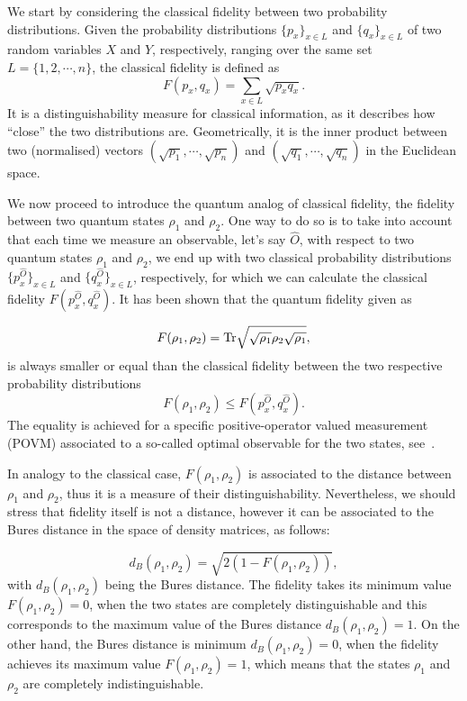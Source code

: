 We start by considering the classical fidelity between two probability distributions. Given the probability distributions $\{p_x\}_{x\in L}$ and $\{q_x\}_{x\in L}$ of two random variables $X$ and $Y$, respectively, ranging over the same set $L=\{1,2,\cdots,n\}$, the classical fidelity is defined as
 \begin{equation*}
 	F(p_x,q_x)=\sum_{x\in L}\sqrt{p_x q_x}.
 \end{equation*}
It is a distinguishability measure for classical information, as it describes how ``close'' the two distributions are. Geometrically, it is the inner product between two (normalised) vectors $(\sqrt{p_1},\cdots,\sqrt{p_n})$ and $(\sqrt{q_1},\cdots,\sqrt{q_n})$ in the Euclidean space. 

We now proceed to introduce the quantum analog of classical fidelity, the fidelity between two quantum states $\rho_1$ and $\rho_2$. One way to do so is to take into account that each time we measure an observable, let's say $\hat{O}$, with respect to two quantum states $\rho_1$ and $\rho_2$, we end up with two classical probability distributions $\{p_x^{\hat{O}}\}_{x\in L}$ and $\{q_x^{\hat{O}}\}_{x\in L}$, respectively, for which we can calculate the classical fidelity $F(p_x^{\hat{O}},q_x^{\hat{O}})$. It has been shown that the quantum fidelity given as 

\begin{equation*}
	F(\rho_1,\rho_2)=\text{Tr}\sqrt{\sqrt{\rho_1}\rho_2\sqrt{\rho_1}},
\end{equation*}
is always smaller or equal than the classical fidelity between the two respective probability distributions
$$F(\rho_1,\rho_2)\leq F(p_x^{\hat{O}},q_x^{\hat{O}}).$$
The equality is achieved for a specific positive-operator valued measurement (POVM) associated to a so-called optimal observable for the two states, see~\cite{fuchs:96}.

In analogy to the classical case, $F(\rho_1,\rho_2)$ is associated to the distance between $\rho_1$ and $\rho_2$, thus it is a measure of their distinguishability. Nevertheless, we should stress that fidelity itself is not a distance, however it can be associated to the Bures distance in the space of density matrices, as follows:

\begin{equation*}
	d_B(\rho_1,\rho_2)=\sqrt{2(1-F(\rho_1,\rho_2))},
\end{equation*}
with $d_B(\rho_1,\rho_2)$ being the Bures distance.
The fidelity takes its minimum value $F(\rho_1,\rho_2)=0$, when the two states are completely distinguishable and this corresponds to the maximum value of the Bures distance $d_B(\rho_1,\rho_2)=1$.
On the other hand, the Bures distance is minimum $d_B(\rho_1,\rho_2)=0$, when the fidelity achieves its maximum value $F(\rho_1,\rho_2)=1$, which means that the states $\rho_1$ and $\rho_2$ are completely indistinguishable.

